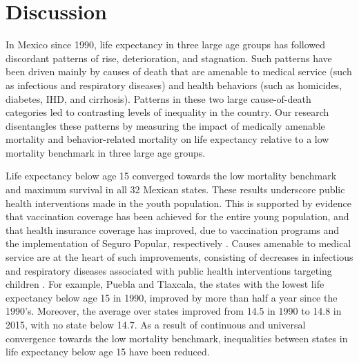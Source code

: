\documentclass{bmcart}
\begin{document}
\section*{Discussion}
In Mexico since 1990, life expectancy in three large age groups has followed discordant patterns of rise, deterioration, and stagnation. Such patterns have been driven mainly by causes of death that are amenable to medical service (such as infectious and respiratory diseases) and health behaviors (such as homicides, diabetes, IHD, and cirrhosis). Patterns in these two large cause-of-death categories led to contrasting levels of inequality in the country. Our research disentangles these patterns by measuring the impact of medically amenable mortality and behavior-related mortality on life expectancy relative to a low mortality benchmark in three large age groups. %

Life expectancy below age 15 converged towards the low mortality benchmark and maximum survival in all 32 Mexican states. These results underscore public health interventions made in the youth population. This is supported by evidence that vaccination coverage has been achieved for the entire young population, and that health insurance coverage has improved, due to vaccination programs and the implementation of Seguro Popular, respectively \cite{urquieta2015evolution}. Causes amenable to medical service are at the heart of such improvements, consisting of decreases in infectious and respiratory diseases associated with public health interventions targeting children \cite{sepulveda2006}. For example, Puebla and Tlaxcala, the states with the lowest life expectancy below age 15 in 1990, improved by more than half a year since the 1990's. Moreover, the average over states improved from 14.5 in 1990 to 14.8 in 2015, with no state below 14.7. As a result of continuous and universal convergence towards the low mortality benchmark, inequalities between states in life expectancy below age 15 have been reduced. 
\end{document}
